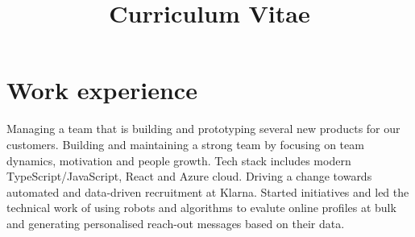 \documentclass[11pt,a4paper,sans]{moderncv}
\title{Curriculum Vitae}
\begin{document}
\makecvtitle

\section{Work experience}
{Managing a team that is building and prototyping several new products for our customers.
Building and maintaining a strong team by focusing on team dynamics, motivation and people growth.
Tech stack includes modern TypeScript/JavaScript, React and Azure cloud.}
{Driving a change towards automated and data-driven recruitment at Klarna.
Started initiatives and led the technical work of using robots and algorithms to evalute
online profiles at bulk and generating personalised reach-out messages based on their data.
}
\end{document}
